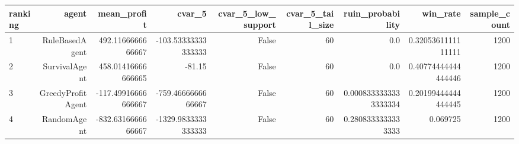 \begin{tabular}{lrrrrrrrr}
\toprule
ranking & agent & mean_profit & cvar_5 & cvar_5_low_support & cvar_5_tail_size & ruin_probability & win_rate & sample_count \\
\midrule
1 & RuleBasedAgent & 492.1166666666667 & -103.53333333333333 & False & 60 & 0.0 & 0.3205361111111111 & 1200 \\
2 & SurvivalAgent & 458.01416666666665 & -81.15 & False & 60 & 0.0 & 0.40774444444444446 & 1200 \\
3 & GreedyProfitAgent & -117.49916666666667 & -759.4666666666667 & False & 60 & 0.0008333333333333334 & 0.20199444444444445 & 1200 \\
4 & RandomAgent & -832.6316666666667 & -1329.9833333333333 & False & 60 & 0.2808333333333333 & 0.069725 & 1200 \\
\bottomrule
\end{tabular}
